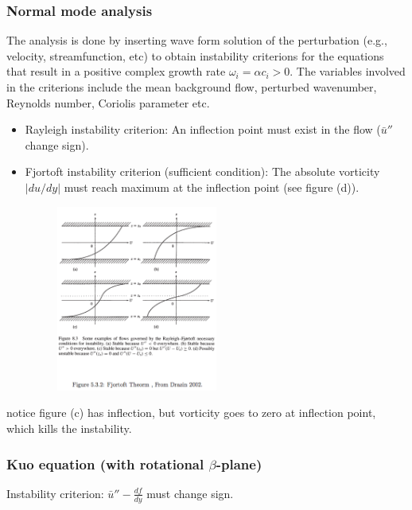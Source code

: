 \subsubsection{Normal mode analysis}
The analysis is done by inserting wave form solution of the perturbation (e.g., velocity, streamfunction, etc) to obtain instability criterions for the equations that result in a positive complex growth rate $\omega_i= \alpha c_i>0$.
The variables involved in the criterions include the mean background flow, perturbed wavenumber, Reynolds number, Coriolis parameter etc.
\begin{itemize}
\subsubsection{Rayleigh equation (2D, $\nu=0$)}
   \item{Rayleigh instability criterion}: An inflection point must exist in the flow ($\bar{u}''$ change sign).
   \item{Fjortoft instability criterion (sufficient condition)}: The absolute vorticity $|du/dy|$ must reach maximum at the inflection point (see figure (d)).
      \begin{figure}[H]
         \includegraphics[width=0.5\textwidth]{FjortoftThm}
      \end{figure}
\end{itemize}
notice figure (c) has inflection, but vorticity goes to zero at inflection point, which kills the instability.
 
\subsubsection{Kuo equation (with rotational $\beta$-plane)}
Instability criterion: $\bar{u}''-\frac{df}{dy}$ must change sign.

